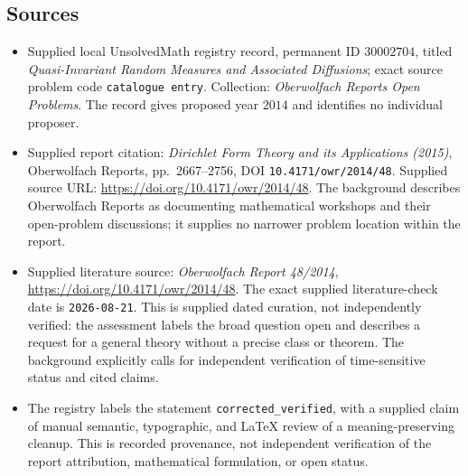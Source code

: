 \documentclass[11pt]{article}
\begin{document}
\subsection{Sources}
\begin{itemize}
\item Supplied local UnsolvedMath registry record, permanent ID \(30002704\), titled \emph{Quasi-Invariant Random Measures and Associated Diffusions}; exact source problem code \texttt{catalogue entry}. Collection: \emph{Oberwolfach Reports Open Problems}. The record gives proposed year \(2014\) and identifies no individual proposer.
\item Supplied report citation: \emph{Dirichlet Form Theory and its Applications (2015)}, Oberwolfach Reports, pp.~2667--2756, DOI \texttt{10.4171/owr/2014/48}. Supplied source URL: \url{https://doi.org/10.4171/owr/2014/48}. The background describes Oberwolfach Reports as documenting mathematical workshops and their open-problem discussions; it supplies no narrower problem location within the report.
\item Supplied literature source: \emph{Oberwolfach Report 48/2014}, \url{https://doi.org/10.4171/owr/2014/48}. The exact supplied literature-check date is \texttt{2026-08-21}. This is supplied dated curation, not independently verified: the assessment labels the broad question open and describes a request for a general theory without a precise class or theorem. The background explicitly calls for independent verification of time-sensitive status and cited claims.
\item The registry labels the statement \texttt{corrected\_verified}, with a supplied claim of manual semantic, typographic, and LaTeX review of a meaning-preserving cleanup. This is recorded provenance, not independent verification of the report attribution, mathematical formulation, or open status.
\end{itemize}
\end{document}
